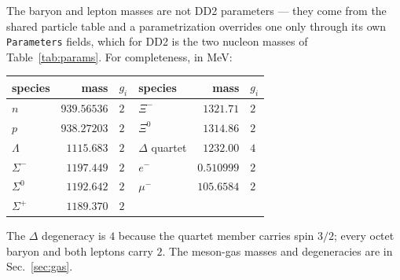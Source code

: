 \documentclass[aps,prc,onecolumn,superscriptaddress,nofootinbib,10pt]{revtex4-2}
\begin{document}
The baryon and lepton masses are not DD2 parameters --- they come from the
shared particle table and a parametrization overrides one only through its own
\texttt{Parameters} fields, which for DD2 is the two nucleon masses of
Table~\ref{tab:params}. For completeness, in MeV:
%
\begin{center}
\begin{tabular}{lrl@{\qquad}lrl}
\toprule
species & mass & $g_i$ & species & mass & $g_i$ \\
\midrule
$n$        & $939.56536$  & $2$ & $\Xi^-$      & $1321.71$   & $2$ \\
$p$        & $938.27203$  & $2$ & $\Xi^0$      & $1314.86$   & $2$ \\
$\Lambda$  & $1115.683$   & $2$ & $\Delta$ quartet & $1232.00$ & $4$ \\
$\Sigma^-$ & $1197.449$   & $2$ & $e^-$        & $0.510999$  & $2$ \\
$\Sigma^0$ & $1192.642$   & $2$ & $\mu^-$      & $105.6584$  & $2$ \\
$\Sigma^+$ & $1189.370$   & $2$ & & & \\
\bottomrule
\end{tabular}
\end{center}
%
The $\Delta$ degeneracy is $4$ because the quartet member carries spin $3/2$;
every octet baryon and both leptons carry $2$. The meson-gas masses and
degeneracies are in Sec.~\ref{sec:gas}.


\end{document}
